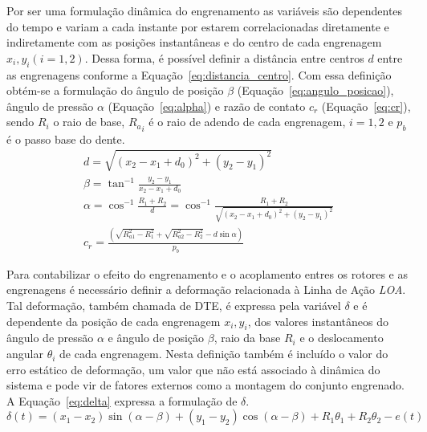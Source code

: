 Por ser uma formulação dinâmica do engrenamento as variáveis são dependentes do tempo e variam a cada instante por estarem correlacionadas diretamente e indiretamente com as posições instantâneas e do centro de cada engrenagem $x_i, y_i (i=1,2)$. Dessa forma, é possível definir a distância entre centros $d$ entre as engrenagens conforme a Equação~\ref{eq:distancia_centro}. Com essa definição obtém-se a formulação do ângulo de posição $\beta$ (Equação~\ref{eq:angulo_posicao}), ângulo de pressão $\alpha$ (Equação~\ref{eq:alpha}) e razão de contato $c_r$ (Equação~\ref{eq:cr}), sendo $R_i$ o raio de base, ${R_a}_i$ é o raio de adendo de cada engrenagem, $i=1,2$ e $p_b$ é o passo base do dente. 
\begin{gather}
	d = \sqrt{(x_2 - x_1 + d_0)^2 + (y_2 - y_1)^2}
	\label{eq:distancia_centro}
\\
	\beta = \tan^{-1} \frac{y_2 - y_1}{x_2 - x_1 + d_0}
	\label{eq:angulo_posicao}
\\
	\alpha = \cos^{-1} \frac{R_1 + R_2}{d} = \cos^{-1} \frac{R_1 + R_2}{\sqrt{(x_2 - x_1 + d_0)^2 + (y_2 - y_1)^2}}
	\label{eq:alpha}
\\
	c_r = \frac{\left( \sqrt{R_{a1}^2 - R_1^2} + \sqrt{R_{a2}^2 - R_2^2} - d \sin \alpha \right)}{p_b}
	\label{eq:cr}
\end{gather}

Para contabilizar o efeito do engrenamento e o acoplamento  entres os rotores e as engrenagens é necessário definir a deformação relacionada à Linha de Ação \textit{LOA}. Tal deformação, também chamada de DTE, é expressa pela variável $\delta$ e é dependente da posição de cada engrenagem  $x_i, y_i$, dos valores instantâneos do ângulo de pressão $\alpha$ e ângulo de posição $\beta$, raio da base $R_i$ e o deslocamento angular $\theta_i$ de cada engrenagem. Nesta definição também é incluído o valor do erro estático de deformação, um valor que não está associado à dinâmica do sistema e pode vir de fatores externos como a montagem do conjunto engrenado. A Equação~\ref{eq:delta} expressa a formulação de $\delta$.
\begin{equation}
	\delta(t) = (x_1 - x_2) \sin (\alpha - \beta) + (y_1 - y_2) \cos (\alpha - \beta) + R_1\theta_1 + R_2\theta_2 - e(t)
	\label{eq:delta}
\end{equation}

